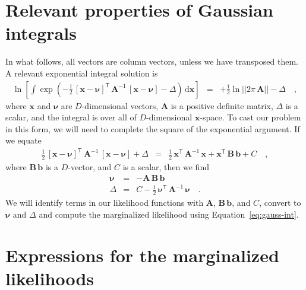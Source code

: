 \documentclass[manuscript, letterpaper]{aastex6}
\newcommand{\project}[1]{\textsl{#1}}
\newcommand{\acronym}[1]{{\small{#1}}}
\newcommand{\apogee}{\project{\acronym{APOGEE}}}
\newcommand{\eqname}{Equation}
\newcommand{\dd}{\mathrm{d}}
\newcommand{\transp}[1]{{#1}^{\!\mathsf{T}}}
\newcommand{\inv}[1]{{#1}^{-1}}
\newcommand{\bs}[1]{\boldsymbol{#1}}
\newcommand{\mat}[1]{\mathbf{#1}}
\renewcommand{\vec}[1]{\bs{#1}}
\begin{document}




\appendix

\section{Relevant properties of Gaussian integrals}
\label{sec:appendixA}

In what follows, all vectors are column vectors, unless we have transposed them.
A relevant exponential integral solution is
\begin{eqnarray}
  \ln\left[\int\exp(-\frac{1}{2}\,
    \transp{[\vec{x}-\vec{\nu}]} \,
    \inv{\mat{A}} \,
    [\vec{x}-\vec{\nu}] - \Delta) \, \dd \vec{x}\right]
  &=& +\frac{1}{2}\ln ||2\pi\,\mat{A}|| -\Delta
  \quad , \label{eq:gauss-int}
\end{eqnarray}
where $\vec{x}$ and $\vec{\nu}$ are $D$-dimensional vectors, $\mat{A}$ is a
positive definite matrix, $\Delta$ is a scalar, and the integral is over all of
$D$-dimensional $\vec{x}$-space.
To cast our problem in this form, we will need to complete the square of the
exponential argument.
If we equate
\begin{eqnarray}
  \frac{1}{2}\,\transp{[\vec{x}-\vec{\nu}]}\,\inv{\mat{A}}\,[\vec{x}-\vec{\nu}] + \Delta
  &=& \frac{1}{2}\,\transp{\vec{x}}\,\inv{\mat{A}}\,\vec{x} + \transp{\vec{x}}\,\mat{B}\,\vec{b} + C
  \quad ,
\end{eqnarray}
where $\mat{B}\,\vec{b}$ is a $D$-vector, and $C$ is a scalar, then we find
\begin{eqnarray}
  \vec{\nu} &=& -\mat{A}\,\mat{B}\,\vec{b} \label{eq:convnu}
  \\
  \Delta & = & C - \frac{1}{2}\,\transp{\vec{\nu}}\,\inv{\mat{A}}\,\vec{\nu} \label{eq:convDelta}
  \quad .
\end{eqnarray}
We will identify terms in our likelihood functions with $\mat{A}$,
$\mat{B}\,\vec{b}$, and $C$, convert to $\vec{\nu}$ and $\Delta$ and compute
the marginalized likelihood using \eqname~\ref{eq:gauss-int}.

\section{Expressions for the marginalized likelihoods}\label{sec:appendix}
\end{document}
